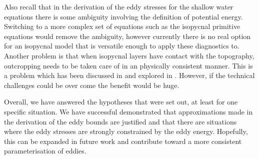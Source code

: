 \documentclass[12pt,a4paper]{report}
\begin{document}
  Also recall that in the derivation of the eddy stresses for the shallow water
  equations there is some ambiguity involving the definition of potential energy. 
  Switching to a more complex set of equations such as the isopycnal primitive equations
  would remove the ambiguity, however currently there is no real option for
  an isopycnal model that is versatile enough to apply these diagnostics to. Another
  problem is that when isopycnal layers have contact with the topography, 
  outcropping needs to be taken care of in an physically  consistent manner. This is a problem
  which has been discussed in \cite{dell2010abyssal} and explored in \cite{diehl2012working}. However, if the technical challenges could be over come
  the benefit would be huge.
  
  Overall, we have answered the hypotheses that were set out, at least for one specific
  situation. We have successful demonstrated that approximations made in the
  derivation of the eddy bounds are justified and that there are situations where
  the eddy stresses are strongly constrained by the eddy energy. Hopefully, this
  can be expanded in future work and contribute toward a more consistent parameterisation
  of eddies.

	 \printbibliography
\end{document}
